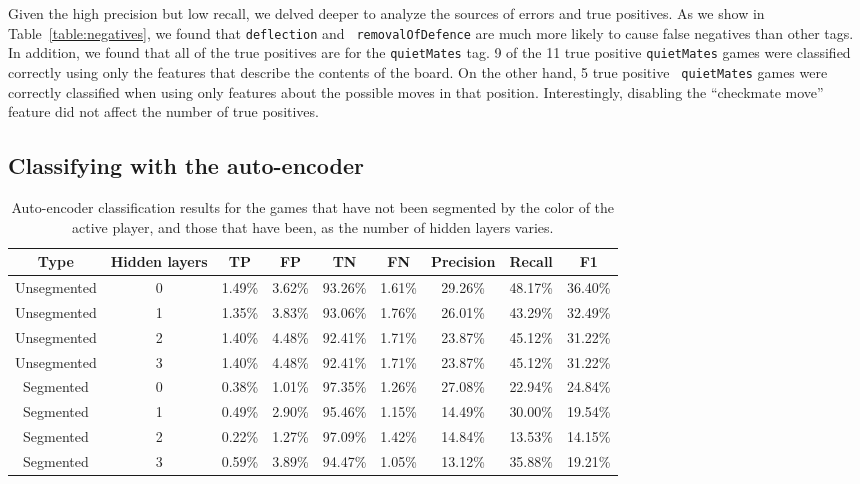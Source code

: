\documentclass[11pt]{article}
\begin{document}
Given the high precision but low recall, we delved deeper to analyze the 
sources of errors and true positives. As we show in 
Table~\ref{table:negatives}, we found that {\tt deflection} and {\tt 
removalOfDefence} are much more likely to cause false negatives than 
other tags. In addition, we found that all of the true positives are for 
the {\tt quietMates} tag. 9 of the 11 true positive {\tt quietMates} 
games were classified correctly using only the features that describe 
the contents of the board. On the other hand, 5 true positive {\tt 
quietMates} games were correctly classified when using only features 
about the possible moves in that position. Interestingly, disabling the 
``checkmate move'' feature did not affect the number of true positives.

\subsection{Classifying with the auto-encoder}
\begin{table*}
\centering
\begin{tabular}{ccccccccc}
\hline
\textbf{Type} & \textbf{Hidden layers} & \textbf{TP} & \textbf{FP} & 
\textbf{TN} & \textbf{FN} & \textbf{Precision} & \textbf{Recall} & 
\textbf{F1} \\ \hline
Unsegmented & 0 & 1.49\% & 3.62\% & 93.26\% & 1.61\% & 29.26\% & 48.17\% 
& 36.40\% \\
Unsegmented & 1 & 1.35\% & 3.83\% & 93.06\% & 1.76\% & 26.01\% & 43.29\% 
& 32.49\% \\
Unsegmented & 2 & 1.40\% & 4.48\% & 92.41\% & 1.71\% & 23.87\% & 45.12\% 
& 31.22\% \\
Unsegmented & 3 & 1.40\% & 4.48\% & 92.41\% & 1.71\% & 23.87\% & 45.12\% 
& 31.22\% \\
\hline
Segmented & 0 & 0.38\% & 1.01\% & 97.35\% & 1.26\% & 27.08\% & 22.94\% & 
24.84\% \\
Segmented & 1 & 0.49\% & 2.90\% & 95.46\% & 1.15\% & 14.49\% & 30.00\% & 
19.54\% \\
Segmented & 2 & 0.22\% & 1.27\% & 97.09\% & 1.42\% & 14.84\% & 13.53\% & 
14.15\% \\
Segmented & 3 & 0.59\% & 3.89\% & 94.47\% & 1.05\% & 13.12\% & 35.88\% & 
19.21\% \\ \hline
\end{tabular} 
\caption{Auto-encoder classification results for the games that have not 
been segmented by the color of the active player, and those that have 
been, as the number of hidden layers varies.}
\label{table:auto-encoder-results}
\end{table*}
\end{document}
